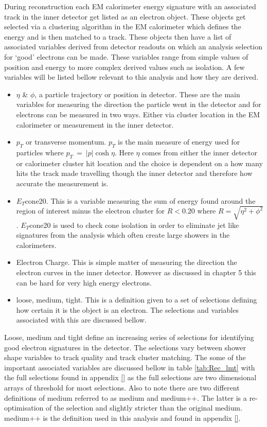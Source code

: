 	During reconstruction each EM calorimeter energy signature with an associated track in the inner detector get listed as an electron object. These objects get selected via a clustering algorithm in the EM calorimeter which defines the energy and is then matched to a track. These objects then have a list of associated variables derived from detector readouts on which an analysis selection for `good' electrons can be made. These variables range from simple values of position and energy to more complex derived values such as isolation. A few variables will be listed bellow relevant to this analysis and how they are derived.

	\begin{itemize}
	\item $\eta$ \& $\phi$, a particle trajectory or position in detector. These are the main variables for measuring the direction the particle went in the detector and for electrons can be measured in two ways. Either via cluster location in the EM calorimeter or measurement in the inner detector.
	\item $p_{T}$ or transverse momentum. $p_{T}$ is the main measure of energy used for particles where $p_{T}~=~|p|\cosh{\eta}$. Here $\eta$ comes from either the inner detector or calorimeter cluster hit location and the choice is dependent on a how many hits the track made travelling though the inner detector and therefore how accurate the measurement is.
	\item $E_{T}$cone20. This is a variable measuring the sum of energy found around the region of interest minus the electron cluster for $R < 0.20$ where $R = \sqrt{\eta^{2} + \phi^{2}}$. $E_{T}$cone20 is used to check cone isolation in order to eliminate jet like signatures from the analysis which often create large showers in the calorimeters.
	\item Electron Charge. This is simple matter of measuring the direction the electron curves in the inner detector. However as discussed in chapter 5 this can be hard for very high energy electrons.
	\item loose, medium, tight. This is a definition given to a set of selections defining how certain it is the object is an electron. The selections and variables associated with this are discussed bellow.
	\end{itemize}

	Loose, medium and tight define an increasing series of selections for identifying good electron signatures in the detector. The selections vary between shower shape variables to track quality and track cluster matching. The some of the important associated variables are discussed bellow in table \ref{tab:Rec_lmt} with the full selections found in appendix \ref{} as the full selections are two dimensional arrays of threshold for most selections. Also to note there are two different definitions of medium referred to as medium and medium++. The latter is a re-optimisation of the selection and slightly stricter than the original medium. medium++ is the definition used in this analysis and found in appendix \ref{}.

